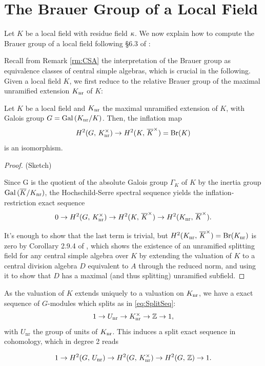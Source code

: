 \documentclass[a4paper, oneside]{memoir}
\begin{document}
\section{The Brauer Group of a Local Field}

Let $K$ be a local field with residue field $\kappa$. We now explain how to compute the Brauer group of a local field following \S 6.3 of \cite{SzamuelyGille}:

Recall from Remark \ref{rm:CSA} the interpretation of the Brauer group as equivalence classes of central simple algebras, which is crucial in the following. Given a local field $K$, we first reduce to the relative Brauer group of the maximal unramified extension $K_{\text{nr}}$ of $K$:

\begin{proposition}
    Let $K$ be a local field and $K_{\text{nr}}$ the maximal unramified extension of $K$, with Galois group $G=\operatorname{Gal}{(K_{\text{nr}}/K)}$. Then, the inflation map
    \[
        H^{2}( G, \, K_{\text{nr}}^\times )\to H^{2}( K, \, \overline{K}^\times )= \mathrm{Br}(K)
    \]
    is an isomorphism.

\end{proposition}

\begin{proof}{(Sketch)}

    Since G is the quotient of the absolute Galois group $\Gamma_K$ of $K$ by the inertia group $\operatorname{Gal}{(\overline{K}/K_{\text{nr}})}$, the Hochschild-Serre spectral sequence yields the inflation-restriction exact sequence
    \[
        0\to H^{2}( G, \, K_{\text{nr}}^\times )\to H^{2}( K, \, \overline{K}^\times )\to H^{2}( K_{\text{nr}}, \, \overline{K}^\times ).
    \]

    It's enough to show that the last term is trivial, but $H^{2}( K_{\text{nr}}, \, \overline{K}^\times )=\mathrm{Br}(K_{\text{nr}})$ is zero by Corollary 2.9.4 of \cite{SzamuelyGille}, which shows the existence of an unramified splitting field for any central simple algebra over $K$ by extending the valuation of $K$ to a central division algebra $D$ equivalent to $A$ through the reduced norm, and using it to show that $D$ has a maximal (and thus splitting) unramified subfield.
\end{proof}

As the valuation of $K$ extends uniquely to a valuation on $K_{\text{nr}}$, we have a exact sequence of $G$-modules which splits as in \eqref{eq:SplitSeq}:
\[
    1\to U_{\text{nr}} \to K_{\text{nr}}^\times\to\mathbb{Z}\to 1,
\]
with $U_{\text{nr}}$ the group of units of $K_{\text{nr}}$. This induces a split exact sequence in cohomology, which in degree 2 reads

\begin{equation}\label{eq:BrSeq}
    1\to H^{2}( G, \, U_{\text{nr}} )\to H^{2}( G, \, K_{\text{nr}}^\times )\to H^{2}( G, \, \mathbb{Z} )\to 1.
\end{equation}
\end{document}

